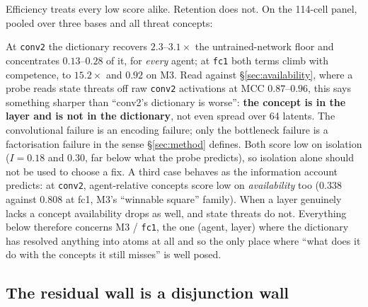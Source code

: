 \documentclass{article}
\begin{document}
Efficiency treats every low score alike. Retention does not. On the 114-cell
panel, pooled over three bases and all threat concepts:

\begin{center}
  \small
  
\end{center}

At \texttt{conv2} the dictionary recovers $2.3$--$3.1\times$ the
untrained-network floor and concentrates $0.13$--$0.28$ of it, for \emph{every}
agent; at \texttt{fc1} both terms climb with competence, to $15.2\times$ and
$0.92$ on M3. Read against \S\ref{sec:availability}, where a probe reads state
threats off raw \texttt{conv2} activations at MCC $0.87$--$0.96$, this says
something sharper than ``conv2's dictionary is worse'': \textbf{the concept is
  in the layer and is not in the dictionary}, not even spread over 64 latents.
The convolutional failure is an encoding failure; only the bottleneck failure is
a factorisation failure in the sense \S\ref{sec:method} defines. Both score low
on isolation ($I = 0.18$ and $0.30$, far below what the probe predicts), so
isolation alone should not be used to choose a fix. A third case behaves as the
information account predicts: at \texttt{conv2}, agent-relative concepts score
low on \emph{availability} too ($0.338$ against $0.808$ at fc1, M3's ``winnable
square'' family). When a layer genuinely lacks a concept availability drops as
well, and state threats do not. Everything below
therefore concerns M3 / \texttt{fc1}, the one (agent, layer) where the
dictionary has resolved anything into atoms at all and so the only place where
``what does it do with the concepts it still misses'' is well posed.

\subsection{The residual wall is a disjunction wall}
\label{sec:disjunction}

\begin{table}[t]
  \centering
  \caption{Single-atom capture by concept shape, agent M3 / \texttt{fc1}, over
    all nine unsupervised dictionaries on that hook (3{,}209 concept verdicts).
    \emph{pinned} $=$ one location and one attribute pole. Within
    \textsc{count}, holding agent-relativity fixed, changing only the logical
    form takes capture from $81.2\%$ to $0.0\%$; holding form fixed and changing
    agent-relativity costs 2 points. solo $=$ concentration; $k_{90}$ and $R^2$
    are medians.}
  \label{tab:disj}
  \small
  
\end{table}
\end{document}
